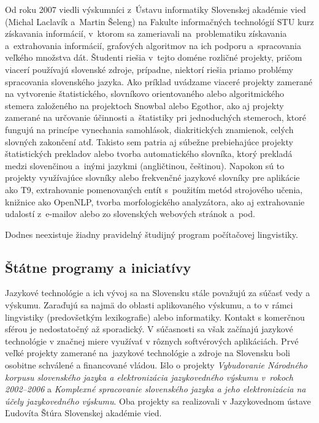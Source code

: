 \begin{multicols}{2}
Od roku 2007 viedli výskumníci z~Ústavu informatiky Slovenskej akadémie vied (Michal Laclavík a~Martin Šeleng) na Fakulte informačných technológií STU kurz získavania informácií, v~ktorom sa zameriavali na~problematiku získavania a~extrahovania informácií\cite{f30}, grafových algoritmov na ich podporu a~spracovania veľkého množstva dát. Študenti riešia v~tejto doméne rozličné projekty, pričom viacerí používajú slovenské zdroje, prípadne, niektorí riešia priamo problémy spracovania slovenského jazyka. Ako príklad uvádzame viaceré projekty zamerané na vytvorenie štatistického, slovníkovo orientovaného alebo algoritmického stemera založeného na projektoch Snowbal alebo Egothor, ako aj projekty zamerané na určovanie účinnosti a~štatistiky pri jednoduchých stemeroch, ktoré fungujú na princípe vynechania samohlások, diakritických znamienok, celých slovných zakončení atď. Takisto sem patria aj súbežne prebiehajúce projekty štatistických prekladov alebo tvorba automatického slovníka, ktorý prekladá medzi slovenčinou a~inými jazykmi (angličtinou, češtinou). Napokon sú to projekty využívajúce slovníky alebo frekvenčné jazykové slovníky pre aplikácie ako T9, extrahovanie pomenovaných entít s~použitím metód strojového učenia, knižnice ako OpenNLP, tvorba morfologického analyzátora, ako aj extrahovanie udalostí z~e-mailov alebo zo slovenských webových stránok a~pod.

Dodnes neexistuje žiadny pravidelný študijný program počítačovej lingvistiky.

\subsection{Štátne programy a iniciatívy}
Jazykové technológie a ich vývoj sa na Slovensku stále považujú za súčasť vedy a výskumu. Zaraďujú sa najmä do oblasti aplikovaného výskumu, a to v rámci lingvistiky (predovšetkým lexikografie) alebo informatiky. Kontakt s komerčnou sférou je nedostatočný až sporadický. V súčasnosti sa však začínajú jazykové technológie v značnej miere využívať v rôznych softvérových aplikáciách.
Prvé veľké projekty zamerané na~jazykové technológie a zdroje na Slovensku boli osobitne schválené a financované vládou. Išlo o projekty \emph{Vybudovanie Národného korpusu slovenského jazyka a elektronizácia jazykovedného výskumu v~rokoch 2002--2006} a \emph{Komplexné spracovanie slovenského jazyka a jeho elektronizácia na účely jazykovedného výskumu}. Oba projekty sa realizovali v Jazykovednom ústave Ľudovíta Štúra Slovenskej akadémie vied.


\end{multicols}
